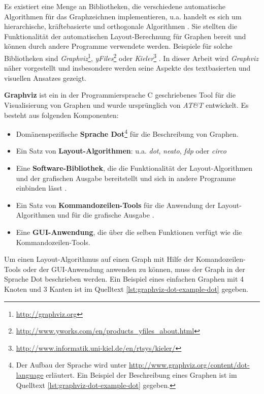 Es existiert eine Menge an Bibliotheken, die verschiedene automatische Algorithmen für das Graphzeichnen implementieren, u.a. handelt es sich um hierarchische, kräftebasierte und orthogonale Algorithmen \cite{Maier12A-Pattern-based}. Sie stellten die Funktionalität der automatischen Layout-Berechnung für Graphen bereit und können durch andere Programme verwendete werden.  Beispiele für solche Bibliotheken sind \textit{Graphviz}\footnote{\url{http://graphviz.org}}, \textit{yFiles}\footnote{\url{http://www.yworks.com/en/products_yfiles_about.html}} oder \textit{Kieler}\footnote{\url{http://www.informatik.uni-kiel.de/en/rtsys/kieler/}} \cite{Maier12A-Pattern-based}. In dieser Arbeit wird \textit{Graphviz} näher vorgestellt und insbesondere werden seine Aspekte des textbasierten und visuellen Ansatzes gezeigt.

\textbf{Graphviz} ist ein in der Programmiersprache C geschriebenes Tool für die Visualisierung von Graphen und wurde ursprünglich von \textit{AT\&T} entwickelt. Es besteht aus folgenden Komponenten:

\begin{itemize}
    \item Domänenspezifische \textbf{Sprache Dot}\footnote{Der Aufbau der Sprache wird unter \url{http://www.graphviz.org/content/dot-language} erläutert. Ein Beispiel der Beschreibung eines Graphen ist im Quelltext \ref{lst:graphviz-dot-example-dot} gegeben.} für die Beschreibung von Graphen.
    \item Ein Satz von \textbf{Layout-Algorithmen}: u.a. \textit{dot}, \textit{neato}, \textit{fdp} oder \textit{circo} \cite{Gansner14Using, NorthGansner14Dot-Manual}
    \item Eine \textbf{Software-Bibliothek}, die die Funktionalität der Layout-Algorithmen und der grafischen Ausgabe bereitstellt und sich in andere Programme einbinden lässt \cite{Gansner14Using}.
    \item Ein Satz von \textbf{Kommandozeilen-Tools} für die Anwendung der Layout-Algorithmen und für die grafische Ausgabe \cite{NorthGansner14Dot-Manual}.
    \item Eine \textbf{GUI-Anwendung}, die über die selben Funktionen verfügt wie die Kommandozeilen-Tools.
\end{itemize}

Um einen Layout-Algorithmus auf einen Graph mit Hilfe der Komandozeilen-Tools oder der GUI-Anwendung anwenden zu können, muss der Graph in der Sprache Dot beschrieben werden. Ein Beispiel eines einfachen Graphen mit 4 Knoten und 3 Kanten ist im Quelltext \ref{lst:graphviz-dot-example-dot} gegeben.


